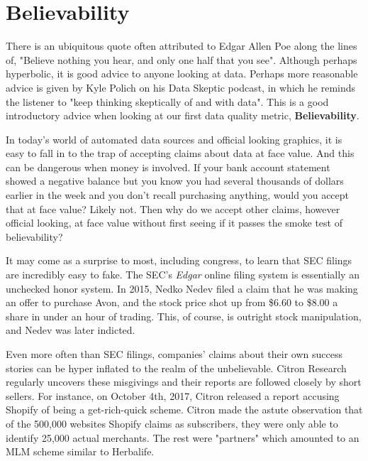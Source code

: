 \section{Believability}

There is an ubiquitous quote often attributed to Edgar Allen Poe along the lines of,  
"Believe nothing you hear, and only one half that you see". Although perhaps hyperbolic, it is 
good advice to anyone looking at data. Perhaps more reasonable advice is given by Kyle Polich on his
Data Skeptic podcast, in which he reminds the listener to "keep thinking skeptically of and with data". \cite{dataskeptic}
This is a good introductory advice when looking at our first data quality metric, \textbf{Believability}.

In today's world of automated data sources and official looking graphics, it is easy to fall in to the trap of 
accepting claims about data at face value. And this can be dangerous when money is involved. If your bank account
statement showed a negative balance but you know you had several thousands of dollars earlier in the week and you 
don't recall purchasing anything, would you accept that at face value? Likely not. Then why do we accept other claims,
however official looking, at face value without first seeing if it passes the smoke test of believability?

It may come as a surprise to most, including congress, to learn that SEC filings are incredibly easy to fake. 
The SEC's \textit{Edgar} online filing system is essentially an unchecked honor system. In 2015, Nedko Nedev filed a claim
that he was making an offer to purchase Avon, and the stock price shot up from \$6.60 to \$8.00 a share in under an hour of 
trading. This, of course, is outright stock manipulation, and Nedev was later indicted. \cite{fakedeal} 

Even more often than SEC filings, companies' claims about their own success stories can be hyper inflated to the realm
of the unbelievable. Citron Research regularly uncovers these misgivings and their reports are followed closely by 
short sellers. For instance, on October 4th, 2017, Citron released a report accusing Shopify of being a get-rich-quick scheme.
Citron made the astute observation that of the 500,000 websites Shopify claims as subscribers, they were only able to 
identify 25,000 actual merchants. The rest were "partners" which amounted to an MLM scheme similar to Herbalife. \cite{shopify}

